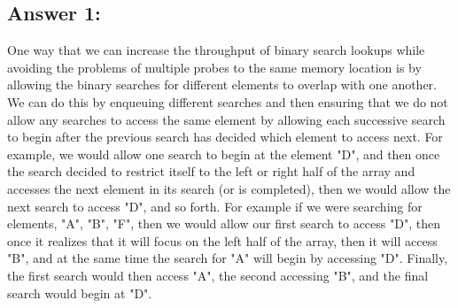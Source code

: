 \documentclass[10pt]{article}
\begin{document}
\subsection*{Answer 1:}
One way that we can increase the throughput of binary search lookups while avoiding the problems of multiple probes to the same memory location is by allowing the binary searches for different elements to overlap with one another. We can do this by enqueuing different searches and then ensuring that we do not allow any searches to access the same element by allowing each successive search to begin after the previous search has decided which element to access next. For example, we would allow one search to begin at the element "D", and then once the search decided to restrict itself to the left or right half of the array and accesses the next element in its search (or is completed), then we would allow the next search to access "D", and so forth. For example
if we were searching for elements, "A", "B", "F", then we would allow our first search to access "D", then once it realizes that it will focus on the left half of the array, then it will access "B", and at the same time the search for "A" will begin by accessing "D". Finally, the first search would then access "A", the second accessing "B", and the final search would begin at "D".
\end{document}
